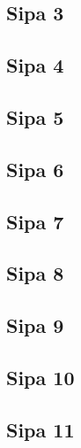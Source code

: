 \subsection{Sipa 3}
\subsection{Sipa 4}
\subsection{Sipa 5}
\subsection{Sipa 6}
\subsection{Sipa 7}
\subsection{Sipa 8}
\subsection{Sipa 9}
\subsection{Sipa 10}
\subsection{Sipa 11}

